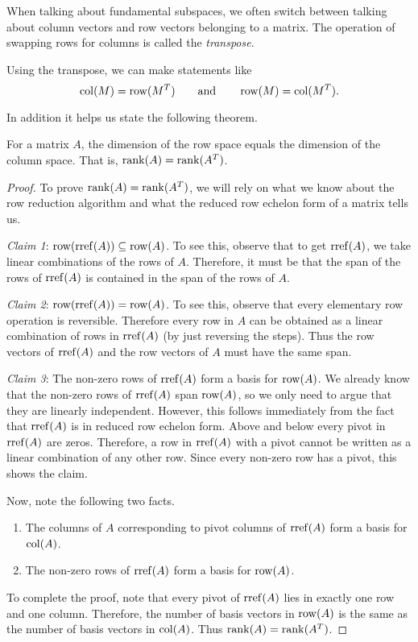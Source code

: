 When talking about fundamental subspaces, we often switch between talking about column vectors and
row vectors belonging to a matrix. The operation of swapping rows for columns is
called the \emph{transpose}.


Using the transpose, we can make statements like
\[
	\operatorname{col}(M)=\operatorname{row}(M^T)\qquad\text{and}\qquad \operatorname{row}(M)=\operatorname{col}(M^T).
\]

In addition it helps us state the following theorem.
\begin{theorem}
	For a matrix $A$, the dimension of the row space equals the dimension of the column space. That is,
	$\operatorname{rank}(A)=\operatorname{rank}(A^T)$.
\end{theorem}
\begin{proof}
	To prove $\operatorname{rank}(A)=\operatorname{rank}(A^T)$, we will rely on what we know about the row reduction algorithm and what
	the reduced row echelon form of a matrix tells us. 

	\emph{Claim 1}: $\operatorname{row}(\operatorname{rref}(A))\subseteq \operatorname{row}(A)$. To see this, observe that to get $\operatorname{rref}(A)$, we take
	linear combinations of the rows of $A$. Therefore, it must be that the span of the rows of $\operatorname{rref}(A)$
	is contained in the span of the rows of $A$.

	\emph{Claim 2}: $\operatorname{row}(\operatorname{rref}(A))=\operatorname{row}(A)$. To see this, observe that every elementary row operation is
	reversible. Therefore every row in $A$ can be obtained as a linear combination of rows in $\operatorname{rref}(A)$
	(by just reversing the steps). Thus the row vectors of $\operatorname{rref}(A)$ and the row vectors of $A$ must
	have the same span.

	\emph{Claim 3}: The non-zero rows of $\operatorname{rref}(A)$ form a basis for $\operatorname{row}(A)$. We already know that
	the non-zero rows of $\operatorname{rref}(A)$ span $\operatorname{row}(A)$, so we only need to argue that they are linearly
	independent. However, this follows immediately from the fact that $\operatorname{rref}(A)$ is in reduced row
	echelon form. Above and below every pivot in $\operatorname{rref}(A)$ are zeros. Therefore, a row in $\operatorname{rref}(A)$
	with a pivot cannot be written as a linear combination of any other row. Since every non-zero
	row has a pivot, this shows the claim.
	
	Now, note the following two facts.
	\begin{enumerate}
		\item The columns of $A$ corresponding to pivot columns of $\operatorname{rref}(A)$ form a basis for $\operatorname{col}(A)$.
		\item The non-zero rows of $\operatorname{rref}(A)$ form a basis for $\operatorname{row}(A)$.
	\end{enumerate}

	To complete the proof, note that every pivot of $\operatorname{rref}(A)$ lies in exactly one row and one column. Therefore,
	the number of basis vectors in $\operatorname{row}(A)$ is the same as the number of basis vectors in $\operatorname{col}(A)$. Thus
	$\operatorname{rank}(A)=\operatorname{rank}(A^T)$.
\end{proof}

